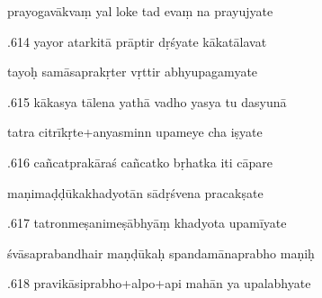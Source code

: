 \documentclass[article,12pt,a4paper]{memoir}%
\newcounter{parCount}
\begin{document}
	  
	  \pstart \leavevmode%
	prayogavākvaṃ yal loke tad evaṃ na prayujyate 
	{}
	\pend%
      

	  
	  \pstart {}.614 yayor atarkitā prāptir dṛśyate kākatālavat 
	{}
	\pend%
      

	  
	  \pstart \leavevmode%
	tayoḥ samāsaprakṛter vṛttir abhyupagamyate 
	{}
	\pend%
      

	  
	  \pstart {}.615 kākasya tālena yathā vadho yasya tu dasyunā 
	{}
	\pend%
      

	  
	  \pstart \leavevmode%
	tatra citrīkṛte+anyasminn upameye cha iṣyate 
	{}
	\pend%
      

	  
	  \pstart {}.616 cañcatprakāraś cañcatko bṛhatka iti cāpare 
	{}
	\pend%
      

	  
	  \pstart \leavevmode%
	maṇimaḍḍūkakhadyotān sādṛśvena pracakṣate 
	{}
	\pend%
      

	  
	  \pstart {}.617 tatronmeṣanimeṣābhyāṃ khadyota upamīyate 
	{}
	\pend%
      

	  
	  \pstart \leavevmode%
	śvāsaprabandhair maṇḍūkaḥ spandamānaprabho maṇiḥ 
	{}
	\pend%
      

	  
	  \pstart {}.618 pravikāsiprabho+alpo+api mahān ya upalabhyate 
	{}
	\pend%
      
\end{document}
